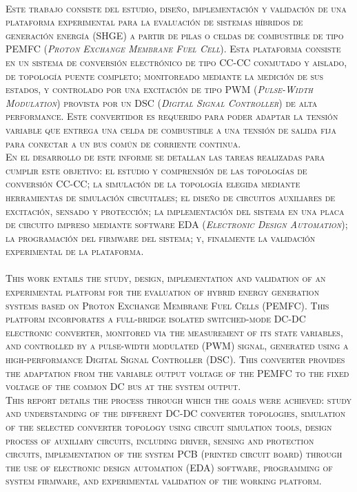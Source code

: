 \huge
\scshape\color{AzulFI_dark}
\\

\normalfont\normalsize\normalcolor
Este trabajo consiste del estudio, diseño, implementación y validación de una plataforma experimental para la evaluación de sistemas híbridos de generación energía (SHGE) a partir de pilas o celdas de combustible de tipo PEMFC (\textit{Proton Exchange Membrane Fuel Cell}). Esta plataforma consiste en un sistema de conversión electrónico de tipo CC-CC conmutado y aislado, de topología puente completo; monitoreado mediante la medición de sus estados, y controlado por una excitación de tipo PWM (\textit{Pulse-Width Modulation}) provista por un DSC (\textit{Digital Signal Controller}) de alta performance. Este convertidor es requerido para poder adaptar la tensión variable que entrega una celda de combustible a una tensión de salida fija para conectar a un bus común de corriente continua.\\

En el desarrollo de este informe se detallan las tareas realizadas para cumplir este objetivo: el estudio y comprensión de las topologías de conversión CC-CC; la simulación de la topología elegida mediante herramientas de simulación circuitales; el diseño de circuitos auxiliares de excitación, sensado y protección; la implementación del sistema en una placa de circuito impreso mediante software EDA (\textit{Electronic Design Automation}); la programación del firmware del sistema; y, finalmente la validación experimental de la plataforma.\\

\vspace{1cm}
\huge
\scshape\color{AzulFI_dark}
\\

\normalsize\normalfont\normalcolor
This work entails the study, design, implementation and validation of an experimental platform for the evaluation of hybrid energy generation systems based on Proton Exchange Membrane Fuel Cells (PEMFC). This platform incorporates a full-bridge isolated switched-mode DC-DC electronic converter, monitored via the measurement of its state variables, and controlled by a pulse-width modulated (PWM) signal, generated using a high-performance Digital Signal Controller (DSC). This converter provides the adaptation from the variable output voltage of the PEMFC to the fixed voltage of the common DC bus at the system output.\\

This report details the process through which the goals were achieved: study and understanding of the different DC-DC converter topologies, simulation of the selected converter topology using circuit simulation tools, design process of auxiliary circuits, including driver, sensing and protection circuits,  implementation of the system PCB (printed circuit board) through the use of electronic design automation (EDA) software, programming of system firmware, and experimental validation of the working platform.\\ 